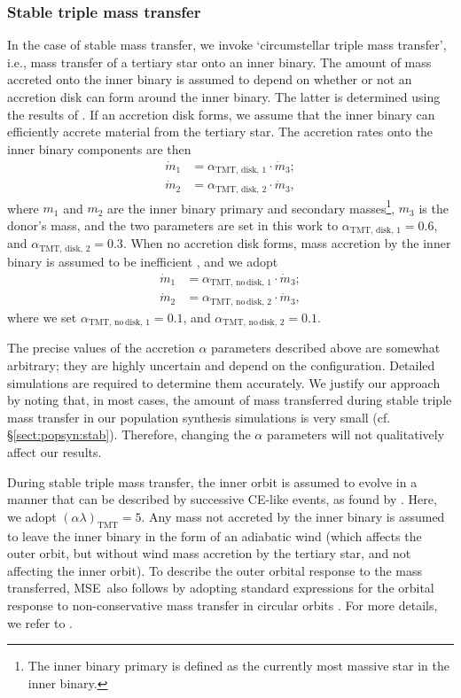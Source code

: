 \documentclass[twocolumn,appendixfloats,tighten]{aastex631}
\newcommand{\mse}{\textsc{MSE}}
\begin{document}
\subsubsection{Stable triple mass transfer}
\label{sect:meth:tr:stab}
In the case of stable mass transfer, we invoke `circumstellar triple mass transfer', i.e., mass transfer of a tertiary star onto an inner binary. The amount of mass accreted onto the inner binary is assumed to depend on whether or not an accretion disk can form around the inner binary. The latter is determined using the results of \citet{1976ApJ...206..509U}. If an accretion disk forms, we assume that the inner binary can efficiently accrete material from the tertiary star. The accretion rates onto the inner binary components are then 
\begin{align}
\dot{m}_1 &= \alpha_{\mathrm{TMT,\,disk,\,1}} \cdot \dot{m}_3; \\
\dot{m}_2 &= \alpha_{\mathrm{TMT,\,disk,\,2}} \cdot \dot{m}_3,
\end{align}
where $m_1$ and $m_2$ are the inner binary primary and secondary masses\footnote{The inner binary primary is defined as the currently most massive star in the inner binary.}, $m_3$ is the donor's mass, and the two parameters are set in this work to $\alpha_{\mathrm{TMT,\,disk,\,1}} = 0.6$, and $\alpha_{\mathrm{TMT,\,disk,\,2}} = 0.3$. When no accretion disk forms, mass accretion by the inner binary is assumed to be inefficient \citep[e.g.,][]{2014MNRAS.438.1909D}, and we adopt
\begin{align}
\dot{m}_1 &= \alpha_{\mathrm{TMT,\,no\,disk,\,1}} \cdot \dot{m}_3; \\
\dot{m}_2 &= \alpha_{\mathrm{TMT,\,no\,disk,\,2}} \cdot \dot{m}_3,
\end{align}
where we set $\alpha_{\mathrm{TMT,\,no\,disk,\,1}} = 0.1$, and $\alpha_{\mathrm{TMT,\,no\,disk,\,2}} = 0.1$.

The precise values of the accretion $\alpha$ parameters described above are somewhat arbitrary; they are highly uncertain and depend on the configuration. Detailed simulations are required to determine them accurately. We justify our approach by noting that, in most cases, the amount of mass transferred during stable triple mass transfer in our population synthesis simulations is very small (cf. \S\ref{sect:popsyn:stab}). Therefore, changing the $\alpha$ parameters will not qualitatively affect our results. 

During stable triple mass transfer, the inner orbit is assumed to evolve in a manner that can be described by successive CE-like events, as found by \citet{2014MNRAS.438.1909D}. Here, we adopt $(\alpha \lambda)_{\mathrm{TMT}} = 5$. Any mass not accreted by the inner binary is assumed to leave the inner binary in the form of an adiabatic wind (which affects the outer orbit, but without wind mass accretion by the tertiary star, and not affecting the inner orbit). To describe the outer orbital response to the mass transferred, \mse~also follows \citet{2014MNRAS.438.1909D} by adopting standard expressions for the orbital response to non-conservative mass transfer in circular orbits \citep[e.g.,][]{1997A&A...327..620S}. For more details, we refer to \citet{2021MNRAS.502.4479H}. 
\end{document}
